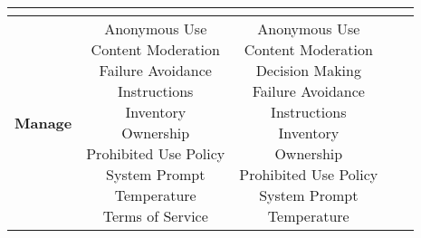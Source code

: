 \documentclass[fleqn]{article}
\begin{document}
\begin{landscape}
\begin{table}[H]
\begin{tabular}{|c|c|c|c|c|}
{		}
		& \\ 
		\hline		
		\textbf{Manage} 
		& \makecell[l]{ 	
			\textbullet\hspace{3pt} Anonymous Use\\ 	
			\textbullet\hspace{3pt} Content Moderation\\ 		
			\textbullet\hspace{3pt} Failure Avoidance\\ 	
			\textbullet\hspace{3pt} Instructions\\ 	
			\textbullet\hspace{3pt} Inventory\\ 	
			\textbullet\hspace{3pt} Ownership\\ 
			\textbullet\hspace{3pt} Prohibited Use Policy\\ 	
			\textbullet\hspace{3pt} System Prompt\\ 	
			\textbullet\hspace{3pt} Temperature\\ 	
			\textbullet\hspace{3pt} Terms of Service\\ 	
		} 
		& \makecell[l]{ 	
			\textbullet\hspace{3pt} Anonymous Use\\ 	
			\textbullet\hspace{3pt} Content Moderation\\
			\textbullet\hspace{3pt} Decision Making\\  		
			\textbullet\hspace{3pt} Failure Avoidance\\ 	
			\textbullet\hspace{3pt} Instructions\\ 	
			\textbullet\hspace{3pt} Inventory\\ 	
			\textbullet\hspace{3pt} Ownership\\ 
			\textbullet\hspace{3pt} Prohibited Use Policy\\ 	
			\textbullet\hspace{3pt} System Prompt\\ 	
			\textbullet\hspace{3pt} Temperature\\ 	
}
\end{tabular}
\end{table}
\end{landscape}
\end{document}
